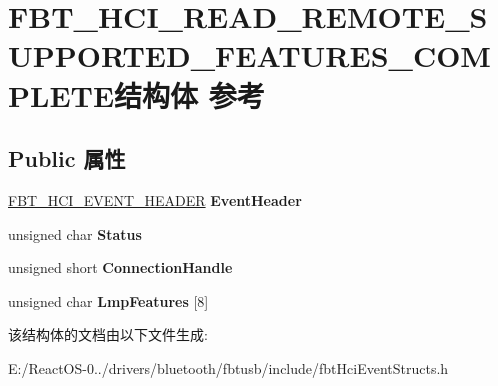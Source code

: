 \hypertarget{struct_f_b_t___h_c_i___r_e_a_d___r_e_m_o_t_e___s_u_p_p_o_r_t_e_d___f_e_a_t_u_r_e_s___c_o_m_p_l_e_t_e}{}\section{F\+B\+T\+\_\+\+H\+C\+I\+\_\+\+R\+E\+A\+D\+\_\+\+R\+E\+M\+O\+T\+E\+\_\+\+S\+U\+P\+P\+O\+R\+T\+E\+D\+\_\+\+F\+E\+A\+T\+U\+R\+E\+S\+\_\+\+C\+O\+M\+P\+L\+E\+T\+E结构体 参考}
\label{struct_f_b_t___h_c_i___r_e_a_d___r_e_m_o_t_e___s_u_p_p_o_r_t_e_d___f_e_a_t_u_r_e_s___c_o_m_p_l_e_t_e}
\subsection*{Public 属性}
\begin{DoxyCompactItemize}
\item 
\mbox{\label{struct_f_b_t___h_c_i___r_e_a_d___r_e_m_o_t_e___s_u_p_p_o_r_t_e_d___f_e_a_t_u_r_e_s___c_o_m_p_l_e_t_e_afc210cbbec33ad1c18366d85fc067769}} 
\hyperlink{struct_f_b_t___h_c_i___e_v_e_n_t___h_e_a_d_e_r}{F\+B\+T\+\_\+\+H\+C\+I\+\_\+\+E\+V\+E\+N\+T\+\_\+\+H\+E\+A\+D\+ER} {\bfseries Event\+Header}
\item 
\mbox{\label{struct_f_b_t___h_c_i___r_e_a_d___r_e_m_o_t_e___s_u_p_p_o_r_t_e_d___f_e_a_t_u_r_e_s___c_o_m_p_l_e_t_e_aad23190ed3bc3828f3ec359ff90b81a1}} 
unsigned char {\bfseries Status}
\item 
\mbox{\label{struct_f_b_t___h_c_i___r_e_a_d___r_e_m_o_t_e___s_u_p_p_o_r_t_e_d___f_e_a_t_u_r_e_s___c_o_m_p_l_e_t_e_ae0b4ca7e83d5a349421639b5441ef0a9}} 
unsigned short {\bfseries Connection\+Handle}
\item 
\mbox{\label{struct_f_b_t___h_c_i___r_e_a_d___r_e_m_o_t_e___s_u_p_p_o_r_t_e_d___f_e_a_t_u_r_e_s___c_o_m_p_l_e_t_e_accdf497d80278cb3778ef9925e899a12}} 
unsigned char {\bfseries Lmp\+Features} \mbox{[}8\mbox{]}
\end{DoxyCompactItemize}


该结构体的文档由以下文件生成\+:\begin{DoxyCompactItemize}
\item 
E\+:/\+React\+O\+S-\/0../drivers/bluetooth/fbtusb/include/fbt\+Hci\+Event\+Structs.\+h\end{DoxyCompactItemize}
